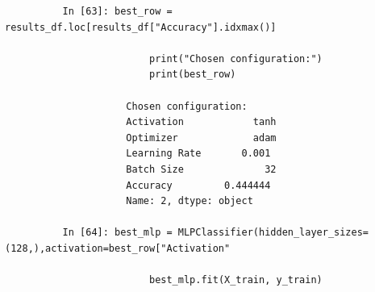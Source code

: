 \documentclass[12pt,a4paper]{article}
\begin{document}
\begin{lstlisting}
          In [63]: best_row = results_df.loc[results_df["Accuracy"].idxmax()]

                         print("Chosen configuration:")
                         print(best_row)

                     Chosen configuration:
                     Activation            tanh
                     Optimizer             adam
                     Learning Rate       0.001
                     Batch Size              32
                     Accuracy         0.444444
                     Name: 2, dtype: object

          In [64]: best_mlp = MLPClassifier(hidden_layer_sizes=(128,),activation=best_row["Activation"

                         best_mlp.fit(X_train, y_train)







\end{lstlisting}
\end{document}
